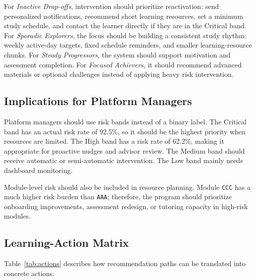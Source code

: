 \documentclass[conference]{IEEEtran}
\begin{document}
For \textit{Inactive Drop-offs}, intervention should prioritize reactivation: send personalized notifications, recommend short learning resources, set a minimum study schedule, and contact the learner directly if they are in the Critical band. For \textit{Sporadic Explorers}, the focus should be building a consistent study rhythm: weekly active-day targets, fixed schedule reminders, and smaller learning-resource chunks. For \textit{Steady Progressors}, the system should support motivation and assessment completion. For \textit{Focused Achievers}, it should recommend advanced materials or optional challenges instead of applying heavy risk intervention.

\subsection{Implications for Platform Managers}

Platform managers should use risk bands instead of a binary label. The Critical band has an actual risk rate of 92.5\%, so it should be the highest priority when resources are limited. The High band has a risk rate of 62.2\%, making it appropriate for proactive nudges and advisor review. The Medium band should receive automatic or semi-automatic intervention. The Low band mainly needs dashboard monitoring.

Module-level risk should also be included in resource planning. Module \texttt{CCC} has a much higher risk burden than \texttt{AAA}; therefore, the program should prioritize onboarding improvements, assessment redesign, or tutoring capacity in high-risk modules.

\subsection{Learning-Action Matrix}

Table~\ref{tab:actions} describes how recommendation paths can be translated into concrete actions.
\end{document}
